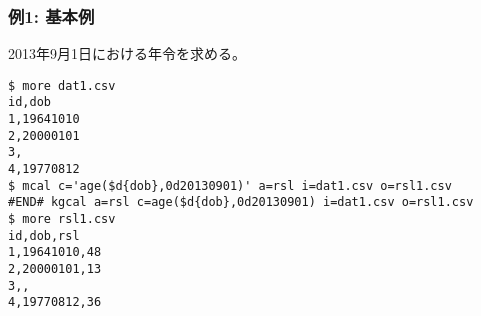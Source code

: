 \subsubsection*{例1: 基本例}

2013年9月1日における年令を求める。


\begin{Verbatim}[baselinestretch=0.7,frame=single]
$ more dat1.csv
id,dob
1,19641010
2,20000101
3,
4,19770812
$ mcal c='age($d{dob},0d20130901)' a=rsl i=dat1.csv o=rsl1.csv
#END# kgcal a=rsl c=age($d{dob},0d20130901) i=dat1.csv o=rsl1.csv
$ more rsl1.csv
id,dob,rsl
1,19641010,48
2,20000101,13
3,,
4,19770812,36
\end{Verbatim}
